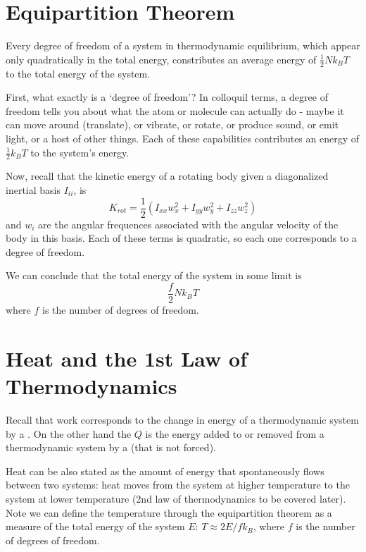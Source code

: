 \documentclass[12pt, a4paper, oneside, openright, titlepage]{book}
\begin{document}
\section{Equipartition Theorem}

\begin{namthm}
    Every degree of freedom of a system in thermodynamic equilibrium, which appear only quadratically in the total energy, constributes an average energy of $\frac{1}{2}Nk_BT$ to the total energy of the system.
\end{namthm}

First, what exactly is a `degree of freedom'? In colloquil terms, a degree of freedom tells you about what the atom or molecule can actually do - maybe it can move around (translate), or vibrate, or rotate, or produce sound, or emit light, or a host of other things. Each of these capabilities contributes an energy of $\frac{1}{2}k_BT$ to the system's energy. 

Now, recall that the kinetic energy of a rotating body given a diagonalized inertial basis $I_{ii}$, is \begin{equation}
    K_{rot} = \frac{1}{2}(I_{xx}w_x^2+I_{yy}w_y^2+I_{zz}w_z^2)
\end{equation}
and $w_i$ are the angular frequences associated with the angular velocity of the body in this basis. Each of these terms is quadratic, so each one corresponds to a degree of freedom. 

We can conclude that the total energy of the system in some limit is \begin{equation*}
    \frac{f}{2}Nk_BT
\end{equation*}
where $f$ is the number of degrees of freedom.

\section{Heat and the 1st Law of Thermodynamics}

\begin{defn}
    Recall that work corresponds to the change in energy of a thermodynamic system by a . On the other hand the  $Q$ is the energy added to or removed from a thermodynamic system by a  (that is not forced).
\end{defn}

Heat can be also stated as the amount of energy that spontaneously flows between two systems: heat moves from the system at higher temperature to the system at lower temperature (2nd law of thermodynamics to be covered later). Note we can define the temperature through the equipartition theorem as a measure of the total energy of the system $E$: $T \approx 2E/fk_B$, where $f$ is the number of degrees of freedom.
\end{document}
